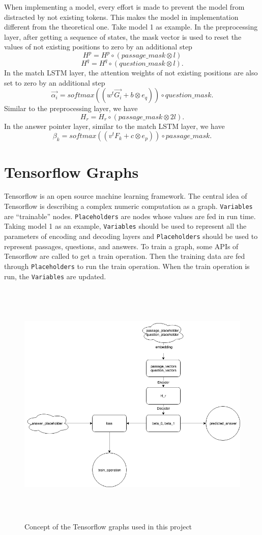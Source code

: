 \documentclass[modernstyle,12pt]{sjsuthesis}
\theoremstyle{definition}
\begin{document}
When implementing a model, every effort is made to prevent the model from distracted by not existing tokens. This makes the model in implementation different from the theoretical one. Take model 1 as example. In the preprocessing layer, after getting a sequence of states, the mask vector is used to reset the values of not existing positions to zero by an additional step
$$H^p = H^p \circ (passage\_mask \otimes l)$$
$$H^q = H^q \circ (question\_mask \otimes l).$$
In the match LSTM layer, the attention weights of not existing positions are also set to zero by an additional step
$$\overrightarrow{\alpha _i} = softmax( (w^t\overrightarrow{G_i} + b \otimes e_q) ) \circ question\_mask .$$
Similar to the preprocessing layer, we have
$$H_r = H_r \circ (passage\_mask \otimes 2l).$$
In the answer pointer layer, similar to the match LSTM layer, we have
$$\beta _k = softmax( (v^tF_k + c \otimes e_p) ) \circ passage\_mask.$$


\section{Tensorflow Graphs}

Tensorflow is an open source machine learning framework. The central idea of Tensorflow is describing a complex numeric computation as a graph.  {\tt Variables} are ``trainable'' nodes.  {\tt Placeholders} are nodes whose values are fed in run time. Taking model 1 as an example,  {\tt Variables} should be used to represent all the parameters of encoding and decoding layers and {\tt Placeholders} should be used to represent passages, questions, and answers. To train a graph, some APIs of Tensorflow are called to get a train operation. Then the training data are fed through {\tt Placeholders} to run the train operation. When the train operation is run, the {\tt Variables} are updated.

\begin{figure}[htbp]\centering
  \includegraphics[width=12cm, height=12cm]{figures/tf_graph.png}
  \caption{Concept of the Tensorflow graphs used in this project}
  \label{f:tf_graph}
\end{figure}
\end{document}
